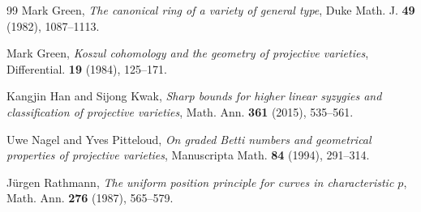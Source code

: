 \documentclass[12pt]{amsart}
\theoremstyle{definition}
\theoremstyle{remark}
\theoremstyle{corollary}
\theoremstyle{theorem}
\theoremstyle{corollary}
\theoremstyle{corollary}
\theoremstyle{definition}
\theoremstyle{remark}
\numberwithin{equation}{section}
\begin{document}
\begin{thebibliography}{99}
Mark Green, \textit{The canonical ring of a variety of general type}, Duke Math. J. \textbf{49} (1982), 1087--1113.

Mark Green, \textit{Koszul cohomology and the geometry of projective varieties}, Differential. \textbf{19} (1984), 125--171.

Kangjin Han and Sijong Kwak, \textit{Sharp bounds for higher linear syzygies and classification of projective varieties}, Math. Ann. \textbf{361} (2015), 535--561.

Uwe Nagel and Yves Pitteloud, \textit{On graded Betti numbers and geometrical properties of projective varieties}, Manuscripta Math. \textbf{84} (1994), 291--314.

J\"{u}rgen Rathmann, \textit{The uniform position principle for curves in characteristic $p$}, Math. Ann. \textbf{276} (1987), 565--579.

\end{thebibliography}
\end{document}
